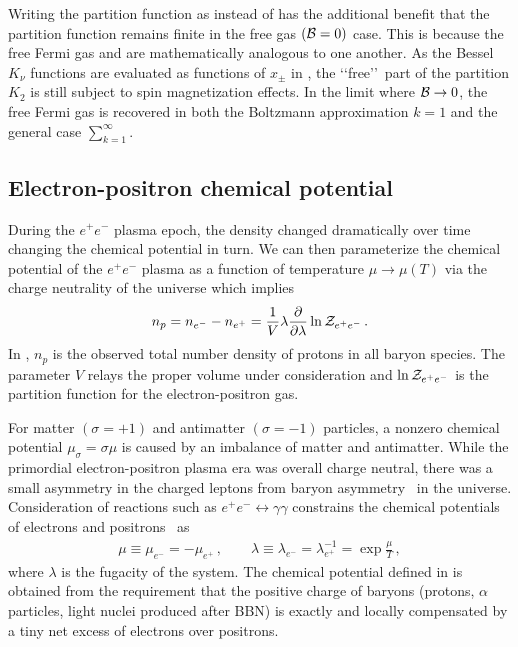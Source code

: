 Writing the partition function as  instead of  has the additional benefit that the partition function remains finite in the free gas $({\cal B}=0)$ case. This is because the free Fermi gas and  are mathematically analogous to one another. As the Bessel $K_{\nu}$ functions are evaluated as functions of $x_{\pm}$ in , the \lq\lq free\rq\rq\ part of the partition $K_{2}$ is still subject to spin magnetization effects. In the limit where ${\cal B}\rightarrow0$, the free Fermi gas is recovered in both the Boltzmann approximation $k=1$ and the general case $\sum_{k=1}^{\infty}$.


\subsection{Electron-positron chemical potential}
\label{sec:potentials}
During the $e^{+}e^{-}$ plasma epoch, the density changed dramatically over time changing the chemical potential in turn. We can then parameterize the chemical potential of the $e^{+}e^{-}$ plasma as a function of temperature $\mu\rightarrow\mu(T)$ via the charge neutrality of the universe which implies
\begin{align}
 \label{chargeneutrality}
 n_{p}=n_{e^{-}}-n_{e^{+}}=\frac{1}{V}\lambda\frac{\partial}{\partial\lambda}\ln{\cal Z}_{e^{+}e^{-}}\,.
\end{align}
In , $n_{p}$ is the observed total number density of protons in all baryon species. The parameter $V$ relays the proper volume under consideration and $\ln{\cal Z}_{e^{+}e^{-}}$ is the partition function for the electron-positron gas.

For matter $(\sigma=+1)$ and antimatter $(\sigma=-1)$ particles, a nonzero chemical potential $\mu_{\sigma}=\sigma\mu$ is caused by an imbalance of matter and antimatter. While the primordial electron-positron plasma era was overall charge neutral, there was a small asymmetry in the charged leptons from baryon asymmetry~\citep{Fromerth:2012fe,Canetti:2012zc} in the universe. Consideration of reactions such as $e^+e^-\leftrightarrow\gamma\gamma$ constrains the chemical potentials of electrons and positrons~\citep{Elze:1980er} as 
\begin{align}
 \label{cpotential}
 \mu\equiv\mu_{e^{-}}=-\mu_{e^{+}}\,,\qquad
 \lambda\equiv\lambda_{e^{-}}=\lambda_{e^{+}}^{-1}=\exp\frac{\mu}{T}\,,
\end{align}
where $\lambda$ is the fugacity of the system. The chemical potential defined in  is obtained from the requirement that the positive charge of baryons (protons, $\alpha$ particles, light nuclei produced after BBN) is exactly and locally compensated by a tiny net excess of electrons over positrons.

